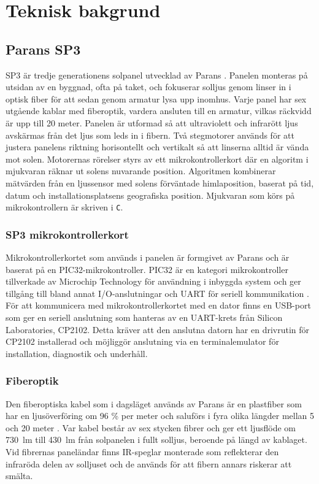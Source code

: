 \section{Teknisk bakgrund} %
\label{sec:teknisk_bakgrund}
    \subsection{Parans SP3} %
    \label{sub:parans_sp3}
        SP3 är tredje generationens solpanel utvecklad av Parans \cite{parans_manual}. Panelen monteras på utsidan av en byggnad, ofta på taket, och fokuserar solljus genom linser in i optisk fiber för att sedan genom armatur lysa upp inomhus. Varje panel har sex utgående kablar med fiberoptik, vardera ansluten till en armatur, vilkas räckvidd är upp till 20 meter. Panelen är utformad så att ultraviolett och infrarött ljus avskärmas från det ljus som leds in i fibern. Två stegmotorer används för att justera panelens riktning horisontellt och vertikalt så att linserna alltid är vända mot solen. Motorernas rörelser styrs av ett mikrokontrollerkort där en algoritm i mjukvaran räknar ut solens nuvarande position. Algoritmen kombinerar mätvärden från en ljussensor med solens förväntade himlaposition, baserat på tid, datum och installationsplatsens geografiska position. Mjukvaran som körs på mikrokontrollern är skriven i \texttt{C}.

        \subsubsection{SP3 mikrokontrollerkort} %
        \label{ssub:sp3_mikrokontrollerkort}
            Mikrokontrollerkortet som används i panelen är formgivet av Parans och är baserat på en PIC32-mikrokontroller. PIC32 är en kategori mikrokontroller tillverkade av Microchip Technology för användning i inbyggda system och ger tillgång till bland annat I/O-anslutningar och UART för seriell kommunikation \cite{PIC32}. För att kommunicera med mikrokontrollerkortet med en dator finns en USB-port som ger en seriell anslutning som hanteras av en UART-krets från Silicon Laboratories, CP2102. Detta kräver att den anslutna datorn har en drivrutin för CP2102 installerad och möjliggör anslutning via en terminalemulator för installation, diagnostik och underhåll.

        \subsubsection{Fiberoptik} %
        \label{ssub:fiberoptik}
            Den fiberoptiska kabel som i dagsläget används av Parans är en plastfiber som har en ljusöverföring om 96 \% per meter och saluförs i fyra olika längder mellan 5 och 20 meter \cite{parans_spec}. Var kabel består av sex stycken fibrer och ger ett ljusflöde om 730~lm till 430~lm från solpanelen i fullt solljus, beroende på längd av kablaget. Vid fibrernas paneländar finns IR-speglar monterade som reflekterar den infraröda delen av solljuset och de används för att fibern annars riskerar att smälta.

